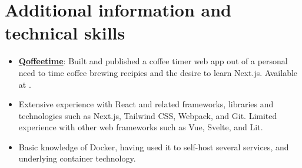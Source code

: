 \documentclass[10pt]{article}
\begin{document}
\section{Additional information and technical skills}
\label{sec:other}

\begin{itemize}
      \item \textbf{\underline{Qoffeetime}}: Built and published a coffee timer web
            app out of a personal need to time coffee brewing recipies and the desire to
            learn Next.js. Available at .
      \item Extensive experience with React and related frameworks, libraries and
            technologies such as Next.js, Tailwind CSS, Webpack, and Git. Limited
            experience with other web frameworks such as Vue, Svelte, and Lit.
      \item Basic knowledge of Docker, having used it to self-host several services,
            and underlying container technology.
\end{itemize}
\end{document}
